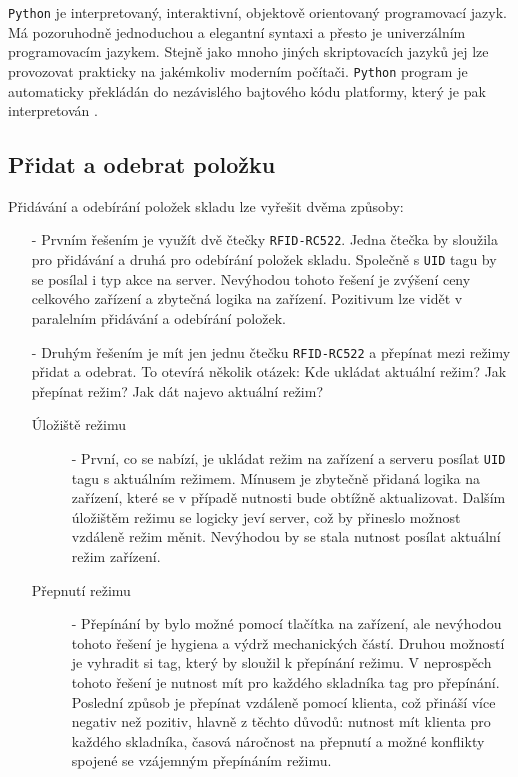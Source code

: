 \documentclass[czech,BP]{thesiskiv}
\begin{document}
			\texttt{Python} je interpretovaný, interaktivní, objektově orientovaný programovací jazyk. Má pozoruhodně jednoduchou a elegantní syntaxi a přesto je univerzálním programovacím jazykem. Stejně jako mnoho jiných skriptovacích jazyků jej lze provozovat prakticky na jakémkoliv moderním počítači. \texttt{Python} program je automaticky překládán do nezávislého bajtového kódu platformy, který je pak interpretován \cite{sanner1999python}.


		\subsection{Přidat a odebrat položku}
			Přidávání a odebírání položek skladu lze vyřešit dvěma způsoby:	
			
				\begin{itemize}								
							
				\item [-] Prvním řešením je využít dvě čtečky \texttt{RFID-RC522}. Jedna čtečka by sloužila pro přidávání a druhá pro odebírání položek skladu.
				Společně s \texttt{UID} tagu by se posílal i typ akce na server. Nevýhodou tohoto řešení je zvýšení ceny celkového zařízení a zbytečná logika na zařízení.
				Pozitivum lze vidět v paralelním přidávání a odebírání položek.
				
							
				\item [-] Druhým řešením je mít jen jednu čtečku \texttt{RFID-RC522} a přepínat mezi režimy přidat a odebrat. 
				To otevírá několik otázek: Kde ukládat aktuální režim? Jak přepínat režim? Jak dát najevo aktuální režim?				
				
		
				\begin{description}				
				
				\item [Úložiště režimu] - První, co se nabízí, je ukládat režim na zařízení a serveru posílat \texttt{UID} tagu s aktuálním režimem.
				Mínusem je zbytečně přidaná logika na zařízení, které se v případě nutnosti bude obtížně aktualizovat.
				Dalším úložištěm režimu se logicky jeví server, což by přineslo možnost vzdáleně režim měnit. 
				Nevýhodou by se stala nutnost posílat aktuální režim zařízení.
				
				\item [Přepnutí režimu] - Přepínání by bylo možné pomocí tlačítka na zařízení, ale nevýhodou tohoto řešení je hygiena a výdrž mechanických částí. 			 
				Druhou možností je vyhradit si tag, který by sloužil k přepínání režimu. V neprospěch tohoto řešení je nutnost mít pro každého skladníka tag pro přepínání. 
				Poslední způsob je přepínat vzdáleně pomocí klienta, což přináší více negativ než pozitiv, hlavně z těchto důvodů: nutnost mít klienta pro každého skladníka, časová náročnost na přepnutí a možné konflikty spojené se vzájemným přepínáním režimu.
				

\end{description}
\end{itemize}
\end{document}
